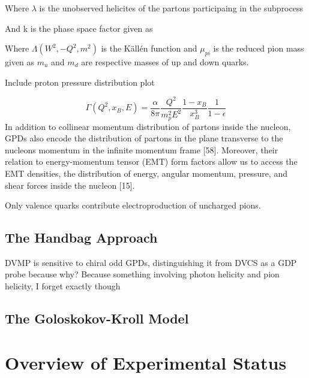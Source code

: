    Where $\lambda$ is the unobserved helicites of the partons participaing in the subprocess
    
    
    
    
    And k is the phase space factor given as 
    
        Where $\Lambda(W^2,-Q^2,m^2)$ is the Källén function and $\mu_{pi}$ is the reduced pion mass given as 
    $m_u$ and $m_d$ are respective masses of up and down quarks.


        Include proton pressure distribution plot

      

    \begin{equation}
                 \Gamma (Q^2, x_B, E) = \frac{\alpha}{8\pi} \frac{Q^2}{m^2_pE^2}\frac{1-x_B}{x_B^3}\frac{1}{1-\epsilon}
    \end{equation}
In addition to collinear momentum distribution of partons inside the
nucleon, GPDs also encode the distribution of partons in the plane transverse to
the nucleons momentum in the infinite momentum frame [58]. Moreover, their
relation to energy-momentum tensor (EMT) form factors allow us to access the
EMT densities, the distribution of energy, angular momentum, pressure, and shear
forces inside the nucleon [15].

Only valence quarks contribute electroproduction of uncharged pions.

    \subsection{The Handbag Approach}

    

 DVMP is sensitive to chiral odd GPDs, distinguishing it from DVCS as a GDP probe because why? Because something involving photon helicity and pion helicity, I forget exactly though
 
    \subsection{The Goloskokov-Kroll Model}
    
\section{Overview of Experimental Status}

